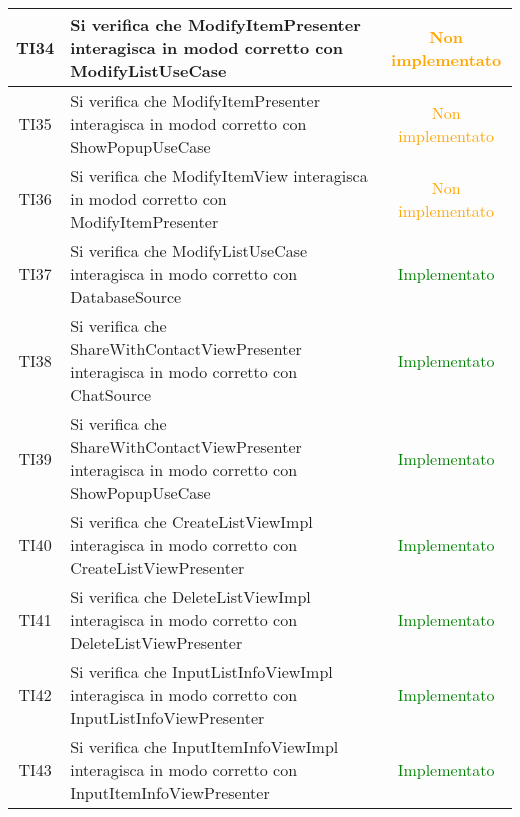 \begin{center}
\begin{longtable}{|c|>{\centering}m{10cm}|c|}
		TI34 & Si verifica che ModifyItemPresenter interagisca in modod corretto con ModifyListUseCase & \textcolor{Orange}{Non implementato}\\ \hline
		TI35 & Si verifica che ModifyItemPresenter interagisca in modod corretto con ShowPopupUseCase & \textcolor{Orange}{Non implementato}\\ \hline
		TI36 & Si verifica che ModifyItemView interagisca in modod corretto con ModifyItemPresenter & \textcolor{Orange}{Non implementato}\\ \hline
		TI37 & Si verifica che ModifyListUseCase interagisca in modo corretto con DatabaseSource & \textcolor{Green}{Implementato}\\ \hline
		TI38 & Si verifica che ShareWithContactViewPresenter interagisca in modo corretto con ChatSource & \textcolor{Green}{Implementato}\\ \hline
		TI39 & Si verifica che ShareWithContactViewPresenter interagisca in modo corretto con ShowPopupUseCase & \textcolor{Green}{Implementato}\\ \hline
		TI40 & Si verifica che CreateListViewImpl interagisca in modo corretto con CreateListViewPresenter & \textcolor{Green}{Implementato}\\ \hline
		TI41 & Si verifica che DeleteListViewImpl interagisca in modo corretto con DeleteListViewPresenter & \textcolor{Green}{Implementato}\\ \hline
		TI42 & Si verifica che InputListInfoViewImpl interagisca in modo corretto con InputListInfoViewPresenter & \textcolor{Green}{Implementato}\\ \hline
		TI43 & Si verifica che InputItemInfoViewImpl interagisca in modo corretto con InputItemInfoViewPresenter & \textcolor{Green}{Implementato}\\ \hline
	\end{longtable}
\end{center}

